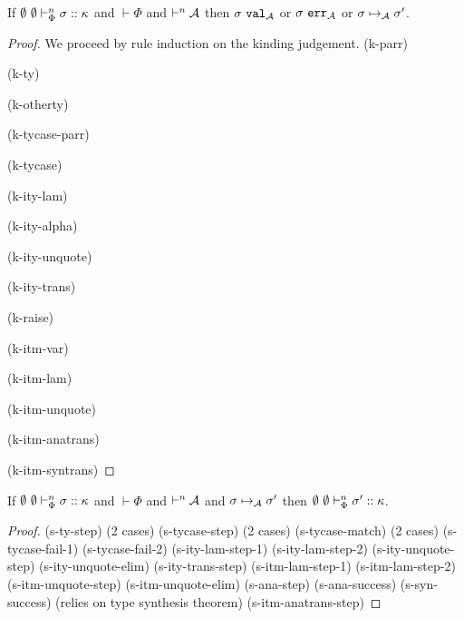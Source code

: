 \documentclass{llncs}
\begin{document}
\begin{theorem}
If $\emptyset~\emptyset \vdash_{\Phi}^{n} \sigma :: \kappa$ and $\vdash \Phi$ and $\vdash^n \mathcal{A}$ then $\sigma~\mathtt{val}_{\mathcal{A}}$ or $\sigma~\mathtt{err}_{\mathcal{A}}$ or $\sigma \mapsto_{\mathcal{A}} \sigma'$.
\end{theorem}
\begin{proof}We proceed by rule induction on the kinding judgement.
(k-parr)

(k-ty)

(k-otherty)

(k-tycase-parr)

(k-tycase)

(k-ity-lam)

(k-ity-alpha)

(k-ity-unquote)

(k-ity-trans)

(k-raise)

(k-itm-var)

(k-itm-lam)

(k-itm-unquote)

(k-itm-anatrans)

(k-itm-syntrans)
\end{proof}

\begin{theorem}
If $\emptyset~\emptyset \vdash_{\Phi}^{n} \sigma :: \kappa$ and $\vdash \Phi$ and $\vdash^n \mathcal{A}$ and $\sigma \mapsto_{\mathcal{A}} \sigma'$ then $\emptyset~\emptyset \vdash_{\Phi}^{n} \sigma' :: \kappa$.
\end{theorem}
\begin{proof}
(s-ty-step) (2 cases)
(s-tycase-step) (2 cases)
(s-tycase-match) (2 cases)
(s-tycase-fail-1)
(s-tycase-fail-2)
(s-ity-lam-step-1)
(s-ity-lam-step-2)
(s-ity-unquote-step)
(s-ity-unquote-elim)
(s-ity-trans-step)
(s-itm-lam-step-1)
(s-itm-lam-step-2)
(s-itm-unquote-step)
(s-itm-unquote-elim)
(s-ana-step)
(s-ana-success)
(s-syn-success) (relies on type synthesis theorem)
(s-itm-anatrans-step)
\end{proof}

\end{document}
